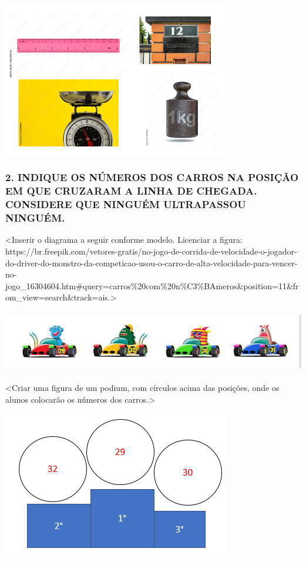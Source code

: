 \includegraphics[width=3.98893in,height=2.65350in]{media/image2.png}


\subsubsection{2. INDIQUE OS NÚMEROS DOS CARROS NA POSIÇÃO EM QUE
CRUZARAM A LINHA DE CHEGADA. CONSIDERE QUE NINGUÉM ULTRAPASSOU NINGUÉM.
}\label{indique-os-nuxfameros-dos-carros-na-posiuxe7uxe3o-em-que-cruzaram-a-linha-de-chegada.-ninguuxe9m-ultrapassou-ninguuxe9m}

\textless{}Inserir o diagrama a seguir conforme modelo. Licenciar a
figura:
https://br.freepik.com/vetores-gratis/no-jogo-de-corrida-de-velocidade-o-jogador-do-driver-do-monstro-da-competicao-usou-o-carro-de-alta-velocidade-para-vencer-no-jogo\_16304604.htm\#query=carros\%20com\%20n\%C3\%BAmeros\&position=11\&from\_view=search\&track=ais.\textgreater{}

\includegraphics[width=5.90556in,height=1.06250in]{media/image3.png}

\textless{}Criar uma figura de um podium, com círculos acima das
posições, onde os alunos colocarão os números dos carros.\textgreater{}

\includegraphics[width=3.92763in,height=2.54202in]{media/image4.png}


